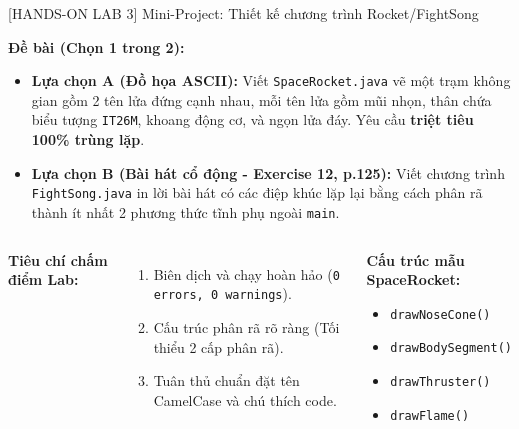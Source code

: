 \documentclass[aspectratio=169, 10pt]{beamer}
\begin{document}
\begin{frame}[fragile]{[HANDS-ON LAB 3] Mini-Project: Thiết kế chương trình Rocket/FightSong}
  \begin{tcolorbox}[colback=white,colframe=UniGreen,title=\textbf{Mini Project Tiết 3 (Thời gian: 20 phút -- Đánh giá sản phẩm tại lớp)}]
    \small
    \textbf{Đề bài (Chọn 1 trong 2):}
    \begin{itemize}\footnotesize
      \item \textbf{Lựa chọn A (Đồ họa ASCII):} Viết \texttt{SpaceRocket.java} vẽ một trạm không gian gồm 2 tên lửa đứng cạnh nhau, mỗi tên lửa gồm mũi nhọn, thân chứa biểu tượng \texttt{IT26M}, khoang động cơ, và ngọn lửa đáy. Yêu cầu \textbf{triệt tiêu 100\% trùng lặp}.
      \item \textbf{Lựa chọn B (Bài hát cổ động - Exercise 12, p.125):} Viết chương trình \texttt{FightSong.java} in lời bài hát có các điệp khúc lặp lại bằng cách phân rã thành ít nhất 2 phương thức tĩnh phụ ngoài \texttt{main}.
    \end{itemize}
  \end{tcolorbox}

  \begin{columns}
    \textbf{Tiêu chí chấm điểm Lab:}
    \begin{enumerate}\scriptsize
      \item Biên dịch và chạy hoàn hảo (\texttt{0 errors, 0 warnings}).
      \item Cấu trúc phân rã rõ ràng (Tối thiểu 2 cấp phân rã).
      \item Tuân thủ chuẩn đặt tên CamelCase và chú thích code.
    \end{enumerate}

    \begin{exampleblock}{\textbf{Cấu trúc mẫu SpaceRocket:}}
      \begin{itemize}\scriptsize
        \item \texttt{drawNoseCone()}
        \item \texttt{drawBodySegment()}
        \item \texttt{drawThruster()}
        \item \texttt{drawFlame()}
      \end{itemize}
    \end{exampleblock}
  \end{columns}
\end{frame}
\end{document}

